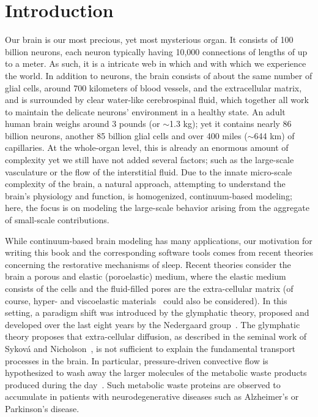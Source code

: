 \chapter{Introduction}
\label{chp:chp1}

Our brain is our most precious, yet most mysterious organ. It consists
of 100 billion neurons, each neuron typically having 10,000 connections
of lengths of up to a meter. As such, it is a intricate web in which
and with which we experience the world. In addition to neurons,
the brain consists of about the same number of glial cells, around 700
kilometers of blood vessels, and the extracellular matrix, and is
surrounded by clear water-like cerebrospinal fluid, which
together all work to maintain the delicate neurons' environment in a
healthy state.  An adult human brain weighs around 3 pounds (or 
$\sim$1.3 kg); yet it contains nearly 86 billion neurons, another 85 billion 
glial cells and over 400 miles ($\sim$644 km) of capillaries.  At the 
whole-organ level, this is already an enormous amount of complexity yet we 
still have not added several factors; such as the large-scale vasculature or 
the flow of the interstitial fluid.  Due to the innate micro-scale complexity 
of the brain,  %
%
a natural approach, attempting to understand the brain's physiology
and function, is homogenized, continuum-based modeling;  here, the 
focus is on modeling the large-scale behavior arising from the aggregate of 
small-scale contributions. 

While continuum-based brain modeling has many applications, our
motivation for writing this book and the corresponding software tools
comes from recent theories concerning the restorative mechanisms of
sleep. Recent theories consider the brain a porous and elastic
(poroelastic) medium, where the elastic medium consists of the cells
and the fluid-filled pores are the extra-cellular matrix (of course, 
hyper- and viscoelastic materials~\cite{goriely2015mechanics,
  budday2019fifty} could also be considered). In this setting, a
paradigm shift was introduced by the glymphatic theory, proposed and
developed over the last eight years by the Nedergaard
group~\cite{iliff2012paravascular}. The glymphatic theory proposes
that extra-cellular diffusion, as described in the seminal work of
Sykov{\'a} and Nicholson~\cite{sykova2008diffusion}, is not sufficient
to explain the fundamental transport processes in the brain. In
particular, pressure-driven convective flow is hypothesized to wash
away the larger molecules of the metabolic waste products produced
during the day~\cite{iliff2012paravascular, jessen2015glymphatic,
  xie2013sleep}. Such metabolic waste proteins are observed to
accumulate in patients with neurodegenerative diseases such as
Alzheimer's or Parkinson's disease.

